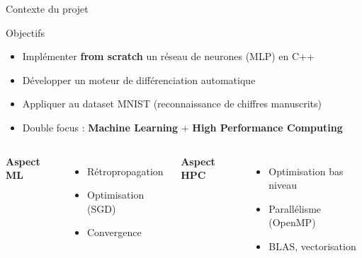 \documentclass[aspectratio=169,xcolor=dvipsnames]{beamer}
\begin{document}
\begin{frame}{Contexte du projet}
\begin{block}{Objectifs}
\begin{itemize}
    \item Implémenter \textbf{from scratch} un réseau de neurones (MLP) en C++
    \item Développer un moteur de différenciation automatique
    \item Appliquer au dataset MNIST (reconnaissance de chiffres manuscrits)
    \item Double focus : \textbf{Machine Learning} + \textbf{High Performance Computing}
\end{itemize}
\end{block}

\vspace{0.3cm}

\begin{columns}[T]
\textbf{Aspect ML}
\begin{itemize}
    \item Rétropropagation
    \item Optimisation (SGD)
    \item Convergence
\end{itemize}

\textbf{Aspect HPC}
\begin{itemize}
    \item Optimisation bas niveau
    \item Parallélisme (OpenMP)
    \item BLAS, vectorisation
\end{itemize}
\end{columns}
\end{frame}
\end{document}
